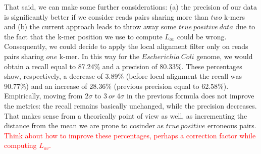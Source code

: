 \documentclass[11pt]{article}
\newcommand\myworries[1]{\textcolor{red}{#1}}
\begin{document}
That said, we can make some further considerations: (a) the precision of our data is significantly better if we consider reads pairs sharing more than $two$ k-mers and (b) the current approach leads to throw away some $true~positive~data$ due to the fact that the k-mer position we use to compute $L_{ov}$ could be wrong.
Consequently, we could decide to apply the local alignment filter only on reads pairs sharing $one$ k-mer. 
In this way for the $Escherichia~Coli$ genome, we would obtain a recall equal to 87.24\% and a precision of 80.33\%.
These percentages show, respectively, a decrease of 3.89\% (before local alignment the recall was 90.77\%) and an increase of 28.36\% (previous precision equal to 62.58\%).
Empirically, moving from $2\sigma$ to $3~or~4\sigma$ in the previous formula does not improve the metrics: the recall remains basically unchanged, while the precision decreases.
That makes sense from a theorically point of view as well, as incrementing the distance from the mean we are prone to cosinder as $true~positive$ erroneous pairs.
\myworries{Think about how to improve these percentages, perhaps a correction factor while computing $L_{ov}$.}
\end{document}
